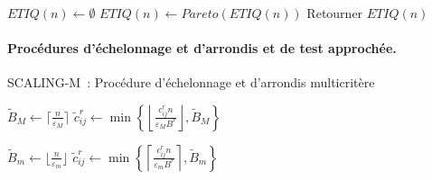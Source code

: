 \documentclass[10pt,francais]{llncs}
\begin{document}
{\begin{algorithm}
\BlankLine
	$ETIQ(n) \leftarrow \emptyset$\;
	$ETIQ(n) \leftarrow Pareto(ETIQ(n))$\;
\BlankLine
Retourner $ETIQ(n)$ \;
\end{algorithm}

\paragraph{Proc\'edures d'\'echelonnage et d'arrondis et de test approch\'ee.} 
\begin{algorithm}\label{algo-scaling-m}
\caption{SCALING-M~: Proc\'edure d'\'echelonnage et d'arrondis multicrit\`ere}
\Entree{$I=\left(G=(V,A);\ c^1,\ldots,c^R:A\rightarrow\mathbb{Q}\right)$ instance de PPC-M, $B\in (\mathbb{Q}_+^*)^R$, $\varepsilon_M,\varepsilon_m\in]0,1[$ erreurs}
\BlankLine
{}
\BlankLine
{}
{
	$\tilde{B}_M \leftarrow \lceil\frac{n}{\varepsilon_M}\rceil$\;
	{
		{$\displaystyle{\tilde{c}^r_{ij}\leftarrow\min
			\left\{
				\left\lfloor\frac{c^r_{ij}n}{\varepsilon_M B^r}\right\rfloor, 	\tilde{B}_M
			\right\}}$}\;}

	$\tilde{B}_m \leftarrow \lfloor\frac{n}{\varepsilon_m}\rfloor$\;
	{
		{$\displaystyle{\tilde{c}^r_{ij}\leftarrow\min
			\left\{
				\left\lceil\frac{c^r_{ij}n}{\varepsilon_m B^r}\right\rceil, \tilde{B}_m
			\right\}}$}\;}
}
\end{algorithm}

}
\end{document}
